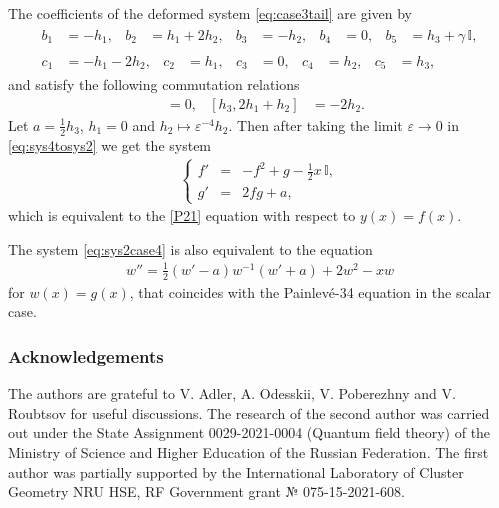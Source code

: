 \documentclass{article}
\theoremstyle{plain}
\newcommand{\PPainleve}{Painlev{\'e}}
\begin{document}
The coefficients of the deformed system \eqref{eq:case3tail} are given by
\begin{gather*}
    \begin{aligned}
    b_1 
    &= - h_1,
    &
    b_2 
    &= h_1 + 2 h_2,
    &
    b_3 
    &= - h_2,
    &
    b_4 
    &= 0,
    &
    b_5
    &= h_3 + \gamma \, \mathbb{I},
    \end{aligned}
    \\[1mm]
    \begin{aligned}
    c_1 
    &= - h_1 - 2 h_2,
    &
    c_2 
    &= h_1,
    &
    c_3
    &= 0,
    &
    c_4
    &= h_2,
    &
    c_5 
    &= h_3,
    \end{aligned}
\end{gather*}
and satisfy the following commutation relations
\begin{align*}
    [h_1, h_2]
    &= 0,
    &
    [h_3, 2 h_1 + h_2]
    &= - 2 h_2.
\end{align*}
Let $a = \frac12 h_3$, $h_1 = 0$ and $h_2 \mapsto \varepsilon^{-4} h_2$. Then after taking the limit $\varepsilon \to 0$ in \eqref{eq:sys4tosys2} we get the system
\begin{gather} \label{eq:sys2case4}
    \left\{
    \begin{array}{lcl}
    f'
    &=& - f^2 + g - \frac12 x \, \mathbb{I},
    \\[2mm]
    g'
    &=& 2 f g + a,
    \end{array}
    \right.
\end{gather}
which is equivalent to the \ref{P21} equation with respect to $y(x) = f (x)$.  

The system \eqref{eq:sys2case4} is also equivalent to the equation 
\begin{gather} \label{eq:P34case4}
    w''
    = \frac12 \left(w' - a\right) w^{-1} \left(w' + a\right)
    + 2 w^2 - x w
\end{gather}
for $w (x) = g (x)$, that coincides with the \PPainleve-34 equation in the scalar case.

 
\subsubsection*{Acknowledgements}

The authors are grateful to V. Adler, A. Odesskii, V. Poberezhny and V. Roubtsov for useful discussions. The research of the second author was carried out under the State Assignment 0029-2021-0004 (Quantum field theory) of the Ministry of Science and Higher Education of the Russian Federation. The first author was partially supported by the International Laboratory of Cluster Geometry NRU HSE, RF Government grant № 075-15-2021-608.
  


\end{document}
